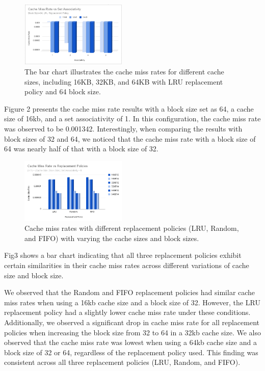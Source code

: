 \documentclass[conference]{IEEEtran}
\begin{document}
\begin{figure}[H]
    \centering
    \includegraphics[width=0.45\textwidth]{sha/sha_cache_vs_setAssocBL64.png}
    \caption{The bar chart illustrates the cache miss rates for different cache sizes, including 16KB, 32KB, and 64KB with LRU replacement policy and 64 block size.}
\end{figure}

Figure 2 presents the cache miss rate results with a block size set as 64, a cache size of 16kb, and a set associativity of 1. In this configuration, the cache miss rate was observed to be 0.001342. Interestingly, when comparing the results with block sizes of 32 and 64, we noticed that the cache miss rate with a block size of 64 was nearly half of that with a block size of 32.


\begin{figure}[H]
    \centering
    \includegraphics[width=0.45\textwidth]{sha/sha_cache_vs_repl8.png}
    \caption{Cache miss rates with different replacement policies (LRU, Random, and FIFO) with varying the cache sizes and block sizes.}
\end{figure}

Fig3 shows a bar chart indicating that all three replacement policies exhibit certain similarities in their cache miss rates across different variations of cache size and block size.


We observed that the Random and FIFO replacement policies had similar cache miss rates when using a 16kb cache size and a block size of 32. However, the LRU replacement policy had a slightly lower cache miss rate under these conditions. Additionally, we observed a significant drop in cache miss rate for all replacement policies when increasing the block size from 32 to 64 in a 32kb cache size. We also observed that the cache miss rate was lowest when using a 64kb cache size and a block size of 32 or 64, regardless of the replacement policy used. This finding was consistent across all three replacement policies (LRU, Random, and FIFO).
\end{document}
